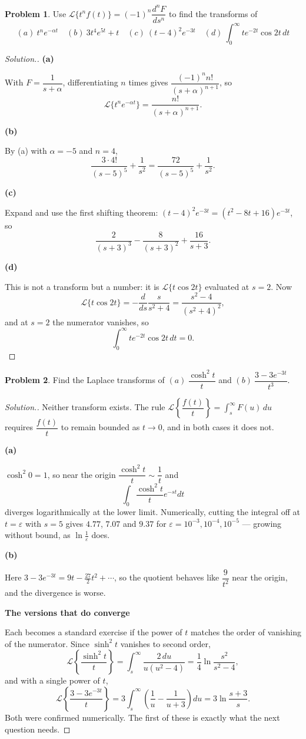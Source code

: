 \documentclass[11pt,a4paper]{article}
\theoremstyle{definition}
\newtheorem{problemx}{Problem}[subsection]
\newenvironment{problem}{\begin{problemx}}{\end{problemx}}
\newenvironment{solution}
  {\renewcommand{\qedsymbol}{}\begin{proof}[\textit{Solution}.]}
  {\end{proof}}
\newcommand{\subhead}[1]{%
  \par\medskip\noindent\textbf{#1}\par\nobreak\smallskip}
\begin{document}
\begin{problem}
Use $\mathcal{L}\{t^nf(t)\} = (-1)^n\dfrac{d^nF}{ds^n}$ to find the transforms
of
\[(a)\ t^ne^{-\alpha t}\quad (b)\ 3t^4e^{5t}+t\quad 
(c)\ (t-4)^2e^{-3t}\quad 
(d)\ \int_0^{\infty}te^{-2t}\cos 2t\,dt\]
\end{problem}
\begin{solution}
\subhead{(a)}
With $F = \dfrac{1}{s+\alpha}$, differentiating $n$ times gives
$\dfrac{(-1)^nn!}{(s+\alpha)^{n+1}}$, so
\[\mathcal{L}\{t^ne^{-\alpha t}\} = \frac{n!}{(s+\alpha)^{n+1}}.\]

\subhead{(b)}
By (a) with $\alpha = -5$ and $n=4$,
\[\frac{3\cdot 4!}{(s-5)^5} + \frac{1}{s^2}
= \frac{72}{(s-5)^5} + \frac{1}{s^2}.\]

\subhead{(c)}
Expand and use the first shifting theorem:
$(t-4)^2e^{-3t} = (t^2-8t+16)e^{-3t}$, so
\[\frac{2}{(s+3)^3} - \frac{8}{(s+3)^2} + \frac{16}{s+3}.\]

\subhead{(d)}
This is not a transform but a number: it is
$\mathcal{L}\{t\cos 2t\}$ evaluated at $s=2$. Now
\[\mathcal{L}\{t\cos 2t\} = -\frac{d}{ds}\frac{s}{s^2+4}
= \frac{s^2-4}{(s^2+4)^2},\]
and at $s=2$ the numerator vanishes, so
\[\int_0^{\infty}te^{-2t}\cos 2t\,dt = 0 .\]
\end{solution}

\begin{problem}
Find the Laplace transforms of
$(a)\ \dfrac{\cosh^2t}{t}$ and $(b)\ \dfrac{3-3e^{-3t}}{t^3}$.
\end{problem}
\begin{solution}
Neither transform exists. The rule
$\mathcal{L}\left\{\dfrac{f(t)}{t}\right\} = \int_s^{\infty}F(u)\,du$ requires
$\dfrac{f(t)}{t}$ to remain bounded as $t\rightarrow 0$, and in both cases it
does not.

\subhead{(a)}
$\cosh^2 0 = 1$, so near the origin $\dfrac{\cosh^2t}{t}\sim\dfrac1t$ and
\[\int_0 \frac{\cosh^2t}{t}e^{-st}dt\]
diverges logarithmically at the lower limit. Numerically, cutting the integral
off at $t=\varepsilon$ with $s=5$ gives $4.77$, $7.07$ and $9.37$ for
$\varepsilon = 10^{-3}, 10^{-4}, 10^{-5}$ --- growing without bound, as
$\ln\frac1\varepsilon$ does.

\subhead{(b)}
Here $3-3e^{-3t} = 9t - \frac{27}{2}t^2+\cdots$, so the quotient behaves like
$\dfrac{9}{t^2}$ near the origin, and the divergence is worse.

\subhead{The versions that do converge}
Each becomes a standard exercise if the power of $t$ matches the order of
vanishing of the numerator. Since $\sinh^2 t$ vanishes to second order,
\[\mathcal{L}\left\{\frac{\sinh^2t}{t}\right\}
= \int_s^{\infty}\frac{2\,du}{u(u^2-4)}
= \frac14\ln\frac{s^2}{s^2-4},\]
and with a single power of $t$,
\[\mathcal{L}\left\{\frac{3-3e^{-3t}}{t}\right\}
= 3\int_s^{\infty}\left(\frac1u-\frac{1}{u+3}\right)du
= 3\ln\frac{s+3}{s}.\]
Both were confirmed numerically. The first of these is exactly what the next
question needs.
\end{solution}
\end{document}
